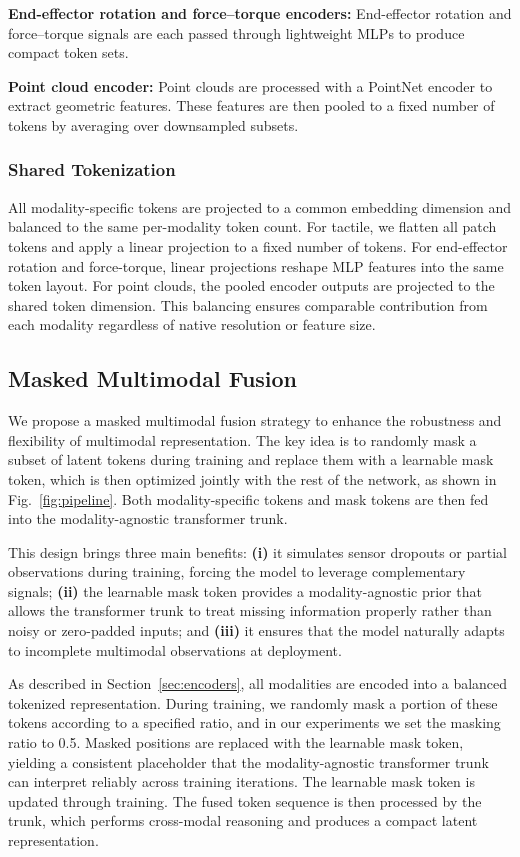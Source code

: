 \documentclass[letterpaper, 10 pt, conference]{ieeeconf}  %
\begin{document}
\textbf{End-effector rotation and force–torque encoders:}  
End-effector rotation and force–torque signals are each passed through lightweight MLPs to produce compact token sets.  

\textbf{Point cloud encoder:}  
Point clouds are processed with a PointNet encoder \cite{qi2017pointnet} to extract geometric features. These features are then pooled to a fixed number of tokens by averaging over downsampled subsets.  

\subsubsection{Shared Tokenization}
All modality-specific tokens are projected to a common embedding dimension and balanced to the same per-modality token count. For tactile, we flatten all patch tokens and apply a linear projection to a fixed number of tokens. For end-effector rotation and force-torque, linear projections reshape MLP features into the same token layout. For point clouds, the pooled encoder outputs are projected to the shared token dimension. This balancing ensures comparable contribution from each modality regardless of native resolution or feature size.



\subsection{Masked Multimodal Fusion} \label{sec:fusion}

We propose a masked multimodal fusion strategy to enhance the robustness and flexibility of multimodal representation. The key idea is to randomly mask a subset of latent tokens during training and replace them with a learnable mask token, which is then optimized jointly with the rest of the network, as shown in Fig.~\ref{fig:pipeline}. Both modality-specific tokens and mask tokens are then fed into the modality-agnostic transformer trunk.


This design brings three main benefits: \textbf{(i)} it simulates sensor dropouts or partial observations during training, forcing the model to leverage complementary signals; \textbf{(ii)} the learnable mask token provides a modality-agnostic prior that allows the transformer trunk to treat missing information properly rather than noisy or zero-padded inputs; and \textbf{(iii)} it ensures that the model naturally adapts to incomplete multimodal observations at deployment.

As described in Section~\ref{sec:encoders}, all modalities are encoded into a balanced tokenized representation. During training, we randomly mask a portion of these tokens according to a specified ratio, and in our experiments we set the masking ratio to 0.5. Masked positions are replaced with the learnable mask token, yielding a consistent placeholder that the modality-agnostic transformer trunk can interpret reliably across training iterations. The learnable mask token is updated through training.  The fused token sequence is then processed by the trunk, which performs cross-modal reasoning and produces a compact latent representation.
\end{document}
